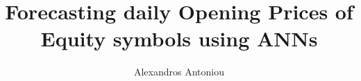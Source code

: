 \author{Alexandros Antoniou}
\title{\bfseries Forecasting daily Opening Prices of Equity symbols using ANNs}
